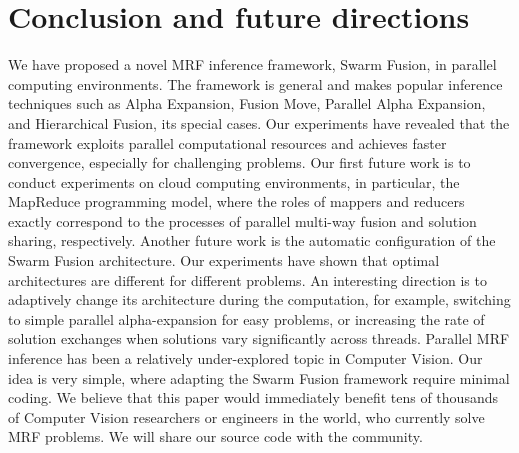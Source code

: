 \section{Conclusion and future directions}
We have proposed a novel MRF inference framework, Swarm Fusion, in
parallel computing environments. The framework is general and makes
popular inference techniques such as Alpha Expansion, Fusion Move,
Parallel Alpha Expansion, and Hierarchical Fusion, its special cases. Our
experiments have revealed that the framework exploits parallel
computational resources and achieves faster convergence, especially for
challenging problems.  Our first future work is to conduct experiments
on cloud computing environments, in particular, the MapReduce
programming model, where the roles of mappers and reducers exactly
correspond to the processes of parallel multi-way fusion and solution
sharing, respectively.  Another future work is the automatic
configuration of the Swarm Fusion architecture.  Our experiments have
shown that optimal architectures are different for different problems.
An interesting direction is to adaptively change its architecture during
the computation, for example, switching to simple parallel
alpha-expansion for easy problems, or increasing the rate of solution
exchanges when solutions vary significantly across threads.
%
Parallel MRF inference has been a relatively under-explored topic in
Computer Vision. Our idea is very simple, where adapting the Swarm Fusion
framework require minimal coding. We believe that this paper would
immediately benefit tens of thousands of Computer Vision researchers or
engineers in the world, who currently solve MRF problems. We will share
our source code with the community.
